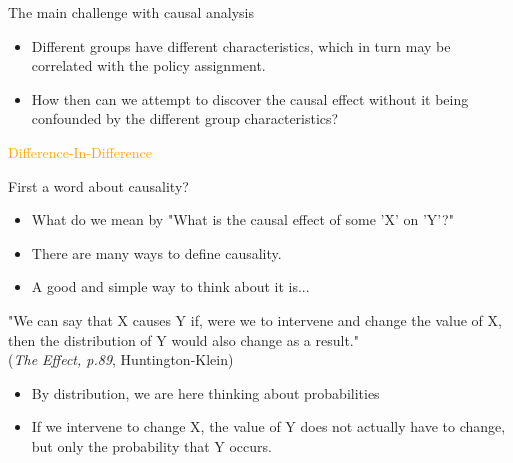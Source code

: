 \documentclass[notes,11pt, aspectratio=169]{beamer}
\begin{document}
\begin{frame}{The main challenge with causal analysis}
    \begin{itemize}
        \item Different groups have different characteristics, which in turn may be correlated with the policy assignment.
        \item How then can we attempt to discover the causal effect without it being confounded by the different group characteristics?
    \end{itemize}
    \flushright
    \vspace{1cm}
    \textcolor{orange}{\huge{Difference-In-Difference}}
\end{frame}


\begin{frame}{First a word about causality?}
    \begin{itemize}
        \item What do we mean by "What is the causal effect of some 'X' on 'Y'?"
        \item There are many ways to define causality.
        \item A good and simple way to think about it is...
    \end{itemize}

    \begin{displayquote}
"We can say that X causes Y if, were we to intervene and change the value of X, then the distribution of Y would also change as a result."
\\
\flushright\tiny (\emph{The Effect, p.89}, Huntington-Klein)
\end{displayquote}
\normalsize
\begin{itemize}
        \item By distribution, we are here thinking about probabilities
        \item If we intervene to change X, the value of Y does not actually have to change, but only the probability that Y occurs. 
    \end{itemize}
\end{frame}
\end{document}
